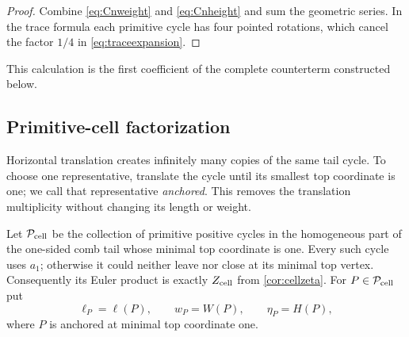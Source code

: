 \documentclass[11pt,reqno]{amsart}
\numberwithin{equation}{section}
\theoremstyle{definition}
\theoremstyle{remark}
\begin{document}
\begin{proof}
Combine \eqref{eq:Cnweight} and \eqref{eq:Cnheight} and sum the geometric
series.  In the trace formula each primitive cycle has four pointed rotations,
which cancel the factor $1/4$ in \eqref{eq:traceexpansion}.
\end{proof}

This calculation is the first coefficient of the complete counterterm
constructed below.

\subsection{Primitive-cell factorization}

Horizontal translation creates infinitely many copies of the same tail cycle.
To choose one representative, translate the cycle until its smallest top
coordinate is one; we call that representative \emph{anchored}.  This removes
the translation multiplicity without changing its length or weight.

Let $\mathcal P_{\rm cell}$ be the collection of primitive positive cycles in
the homogeneous part of the one-sided comb tail whose minimal top coordinate
is one.  Every
such cycle uses $a_1$; otherwise it could neither leave nor close at its minimal
top vertex.  Consequently its Euler product is exactly
$Z_{\rm cell}$ from \cref{cor:cellzeta}.  For
$P\in\mathcal P_{\rm cell}$ put
\begin{equation}\label{eq:cell-data}
 \ell_P=\ell(P),\qquad w_P=W(P),\qquad \eta_P=H(P),
\end{equation}
where $P$ is anchored at minimal top coordinate one.
\end{document}
